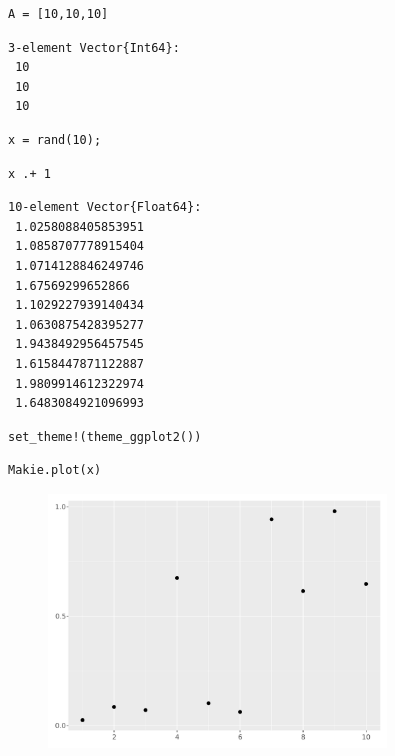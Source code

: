 \begin{lstlisting}[language=JuliaLocal, style=julia]
A = [10,10,10]
\end{lstlisting}

\begin{verbatim}
3-element Vector{Int64}:
 10
 10
 10
\end{verbatim}

\begin{lstlisting}[language=JuliaLocal, style=julia]
x = rand(10);
\end{lstlisting}

\begin{lstlisting}[language=JuliaLocal, style=julia]
x .+ 1
\end{lstlisting}

\begin{verbatim}
10-element Vector{Float64}:
 1.0258088405853951
 1.0858707778915404
 1.0714128846249746
 1.67569299652866
 1.1029227939140434
 1.0630875428395277
 1.9438492956457545
 1.6158447871122887
 1.9809914612322974
 1.6483084921096993
\end{verbatim}

\begin{lstlisting}[language=JuliaLocal, style=julia]
set_theme!(theme_ggplot2())
\end{lstlisting}

\begin{lstlisting}[language=JuliaLocal, style=julia]
Makie.plot(x)
\end{lstlisting}

\begin{figure}[H]
	\centering
	\includegraphics[width=0.8\textwidth]{./figures/notebooktest_figure2.pdf}
	\label{fig:notebooktest_figure2.pdf}

\end{figure}

